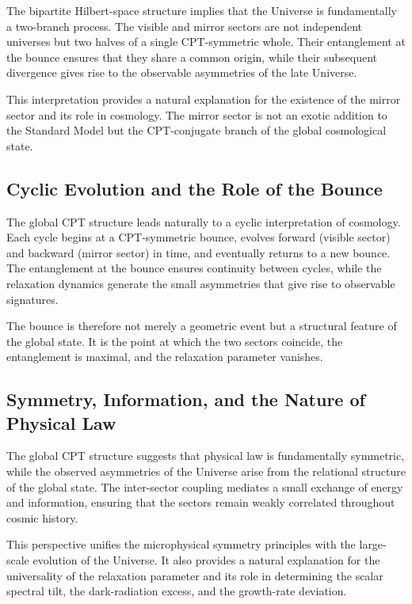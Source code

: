 \documentclass[11pt,a4paper]{article}
\begin{document}
The bipartite Hilbert-space structure implies that the Universe is fundamentally a two-branch process. The visible and mirror sectors are not independent universes but two halves of a single CPT-symmetric whole. Their entanglement at the bounce ensures that they share a common origin, while their subsequent divergence gives rise to the observable asymmetries of the late Universe.

This interpretation provides a natural explanation for the existence of the mirror sector and its role in cosmology. The mirror sector is not an exotic addition to the Standard Model but the CPT-conjugate branch of the global cosmological state.

\subsection{Cyclic Evolution and the Role of the Bounce}

The global CPT structure leads naturally to a cyclic interpretation of cosmology. Each cycle begins at a CPT-symmetric bounce, evolves forward (visible sector) and backward (mirror sector) in time, and eventually returns to a new bounce. The entanglement at the bounce ensures continuity between cycles, while the relaxation dynamics generate the small asymmetries that give rise to observable signatures.

The bounce is therefore not merely a geometric event but a structural feature of the global state. It is the point at which the two sectors coincide, the entanglement is maximal, and the relaxation parameter vanishes.

\subsection{Symmetry, Information, and the Nature of Physical Law}

The global CPT structure suggests that physical law is fundamentally symmetric, while the observed asymmetries of the Universe arise from the relational structure of the global state. The inter-sector coupling mediates a small exchange of energy and information, ensuring that the sectors remain weakly correlated throughout cosmic history.

This perspective unifies the microphysical symmetry principles with the large-scale evolution of the Universe. It also provides a natural explanation for the universality of the relaxation parameter and its role in determining the scalar spectral tilt, the dark-radiation excess, and the growth-rate deviation.
\end{document}
